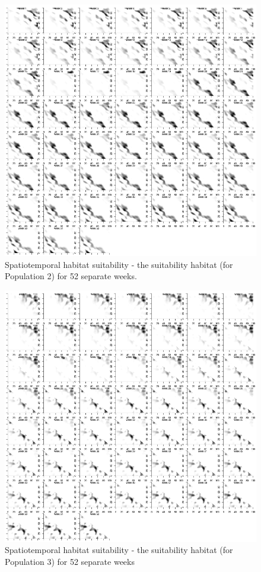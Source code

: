 \documentclass[review]{elsarticle}
\begin{document}
\begin{figure}[!ht]
	\includegraphics[width = \linewidth]{Plots/habitat_spatiotemp_spp_2}
	\caption{Spatiotemporal habitat suitability - the suitability habitat
		(for Population 2) for 52 separate weeks.}
	\label{fig:6}
\end{figure}

\begin{figure}[!ht]
	\includegraphics[width = \linewidth]{Plots/habitat_spatiotemp_spp_3}
	\caption{Spatiotemporal habitat suitability - the suitability habitat
		(for Population 3) for 52 separate weeks}
	\label{fig:7}
\end{figure}
\end{document}
